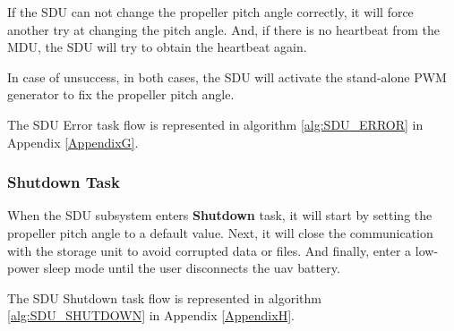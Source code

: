 If the SDU can not change the propeller pitch angle correctly, it will force another try at changing the pitch angle.
And, if there is no heartbeat from the MDU, the SDU will try to obtain the heartbeat again.

In case of unsuccess, in both cases, the SDU will activate the stand-alone \gls{PWM} generator to fix the propeller pitch angle.

The SDU Error task flow is represented in algorithm \ref{alg:SDU_ERROR} in Appendix \ref{AppendixG}.

\subsubsection{Shutdown Task}
When the SDU subsystem enters \textbf{Shutdown} task, it will start by setting the propeller pitch angle to a default value.
Next, it will close the communication with the storage unit to avoid corrupted data or files.
And finally, enter a low-power sleep mode until the user disconnects the \gls{uav} battery.

The SDU Shutdown task flow is represented in algorithm \ref{alg:SDU_SHUTDOWN} in Appendix \ref{AppendixH}.
